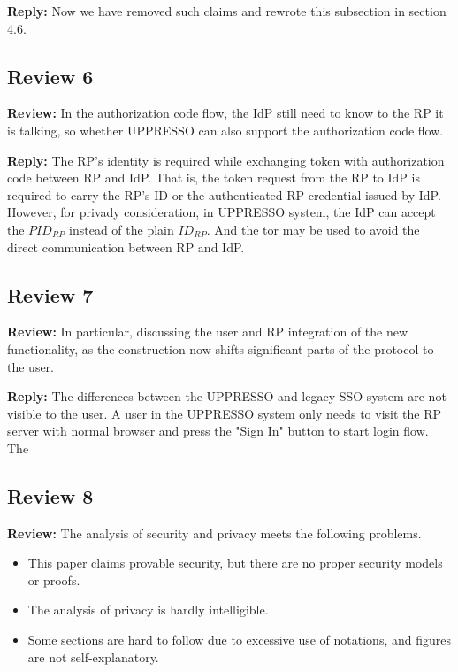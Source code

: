 \documentclass[letterpaper,onecolumn,10pt]{article}
\begin{document}
\vspace{1mm}\noindent\textbf{Reply:}
Now we have removed such claims and rewrote this subsection in section 4.6.

\subsection*{Review 6}
\vspace{1mm}\noindent\textbf{Review:}
In the authorization code flow, the IdP still need to know to the RP it is talking, so whether UPPRESSO can also support the authorization code flow.

\vspace{1mm}\noindent\textbf{Reply:}
The RP's identity is required while exchanging token with authorization code between RP and IdP.
That is, the token request from the RP to IdP is required to carry the RP's ID or the authenticated RP credential issued by IdP.
However, for privady consideration, in UPPRESSO system, the IdP can accept the $PID_{RP}$ instead of the plain $ID_{RP}$.
And the tor may be used to avoid the direct communication between RP and IdP.


\subsection*{Review 7}
\vspace{1mm}\noindent\textbf{Review:}
In particular, discussing the user and RP integration of the new functionality, as the construction now shifts significant parts of the protocol to the user.

\vspace{1mm}\noindent\textbf{Reply:}
The differences between the UPPRESSO and legacy SSO system are not visible to the user. 
A user in the UPPRESSO system only needs to visit the RP server with normal browser and press the "Sign In" button to start login flow.  
The 

\subsection*{Review 8}
\vspace{1mm}\noindent\textbf{Review:}
The analysis of security and privacy meets the following problems.
\begin{itemize}
 \item This paper claims provable security, but there are no proper security models or proofs.
 \item The analysis of privacy is hardly intelligible.
 \item Some sections are hard to follow due to excessive use of notations, and figures are not self-explanatory.
\end{itemize}
\end{document}
